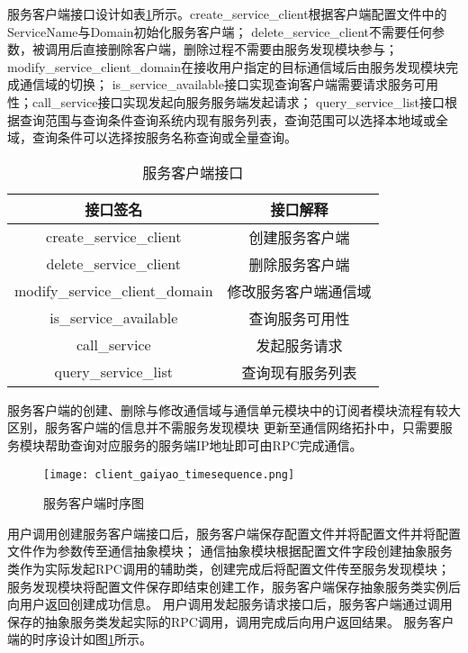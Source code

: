服务客户端接口设计如表\ref{service_client_interface}所示。create\_service\_client根据客户端配置文件中的ServiceName与Domain初始化服务客户端；
delete\_service\_client不需要任何参数，被调用后直接删除客户端，删除过程不需要由服务发现模块参与；
modify\_service\_client\_domain在接收用户指定的目标通信域后由服务发现模块完成通信域的切换；
is\_service\_available接口实现查询客户端需要请求服务可用性；call\_service接口实现发起向服务服务端发起请求；
query\_service\_list接口根据查询范围与查询条件查询系统内现有服务列表，查询范围可以选择本地域或全域，查询条件可以选择按服务名称查询或全量查询。
\begin{table}[htb]
  \centering\small
  \caption{服务客户端接口}
  \renewcommand\arraystretch{1.2}
  \label{service_client_interface}
  \begin{tabular}{cc}
    \toprule
    接口签名 & 接口解释 \\
    \midrule
    create\_service\_client & 创建服务客户端\\
    delete\_service\_client & 删除服务客户端\\
    modify\_service\_client\_domain & 修改服务客户端通信域\\
    is\_service\_available & 查询服务可用性 \\
    call\_service & 发起服务请求\\
    query\_service\_list & 查询现有服务列表\\
    \bottomrule
  \end{tabular}
\end{table}


服务客户端的创建、删除与修改通信域与通信单元模块中的订阅者模块流程有较大区别，服务客户端的信息并不需服务发现模块
更新至通信网络拓扑中，只需要服务模块帮助查询对应服务的服务端IP地址即可由RPC完成通信。

\begin{figure}[H]
  \centering
  \texttt{[image: client\_gaiyao\_timesequence.png]}
  \caption{服务客户端时序图}
  \label{client_gaiyao_timesequence}
\end{figure}

用户调用创建服务客户端接口后，服务客户端保存配置文件并将配置文件并将配置文件作为参数传至通信抽象模块；
通信抽象模块根据配置文件字段创建抽象服务类作为实际发起RPC调用的辅助类，创建完成后将配置文件传至服务发现模块；
服务发现模块将配置文件保存即结束创建工作，服务客户端保存抽象服务类实例后向用户返回创建成功信息。
用户调用发起服务请求接口后，服务客户端通过调用保存的抽象服务类发起实际的RPC调用，调用完成后向用户返回结果。
服务客户端的时序设计如图\ref{client_gaiyao_timesequence}所示。

